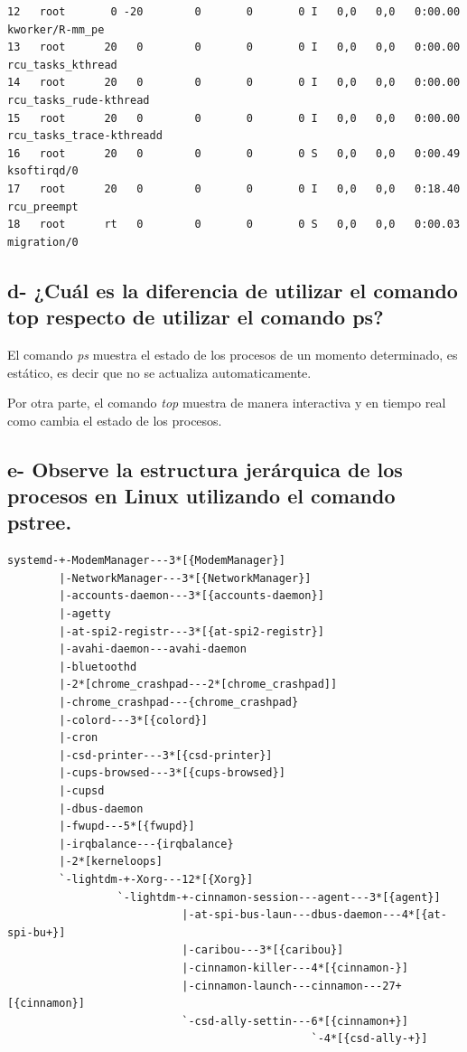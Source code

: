 \documentclass{article}
\begin{document}
\begin{commandline}
{\begin{verbatim}
12   root       0 -20        0       0       0 I   0,0   0,0   0:00.00  kworker/R-mm_pe
13   root      20   0        0       0       0 I   0,0   0,0   0:00.00  rcu_tasks_kthread
14   root      20   0        0       0       0 I   0,0   0,0   0:00.00  rcu_tasks_rude-kthread
15   root      20   0        0       0       0 I   0,0   0,0   0:00.00  rcu_tasks_trace-kthreadd
16   root      20   0        0       0       0 S   0,0   0,0   0:00.49  ksoftirqd/0
17   root      20   0        0       0       0 I   0,0   0,0   0:18.40  rcu_preempt
18   root      rt   0        0       0       0 S   0,0   0,0   0:00.03  migration/0
\end{verbatim}
}
\end{commandline}

\subsection*{d- ¿Cuál es la diferencia de utilizar el comando top respecto de utilizar el comando ps?}

\noindent
El comando \textit{ps} muestra el estado de los procesos de un momento determinado, es estático, es decir que no se actualiza automaticamente.

\noindent
Por otra parte, el comando \textit{top} muestra de manera interactiva y en tiempo real como cambia el estado de los procesos.

\subsection*{e- Observe la estructura jerárquica de los procesos en Linux utilizando el comando pstree.}

\begin{commandline}
 {
\begin{verbatim}
systemd-+-ModemManager---3*[{ModemManager}]
        |-NetworkManager---3*[{NetworkManager}]
        |-accounts-daemon---3*[{accounts-daemon}]
        |-agetty
        |-at-spi2-registr---3*[{at-spi2-registr}]
        |-avahi-daemon---avahi-daemon
        |-bluetoothd
        |-2*[chrome_crashpad---2*[chrome_crashpad]]
        |-chrome_crashpad---{chrome_crashpad}
        |-colord---3*[{colord}]
        |-cron
        |-csd-printer---3*[{csd-printer}]
        |-cups-browsed---3*[{cups-browsed}]
        |-cupsd
        |-dbus-daemon
        |-fwupd---5*[{fwupd}]
        |-irqbalance---{irqbalance}
        |-2*[kerneloops]
        `-lightdm-+-Xorg---12*[{Xorg}]
                 `-lightdm-+-cinnamon-session---agent---3*[{agent}]
                           |-at-spi-bus-laun---dbus-daemon---4*[{at-spi-bu+}]
                           |-caribou---3*[{caribou}]
                           |-cinnamon-killer---4*[{cinnamon-}]
                           |-cinnamon-launch---cinnamon---27+[{cinnamon}]
                           `-csd-ally-settin---6*[{cinnamon+}]
                                               `-4*[{csd-ally-+}]
\end{verbatim}
}
\end{commandline}
\end{document}
